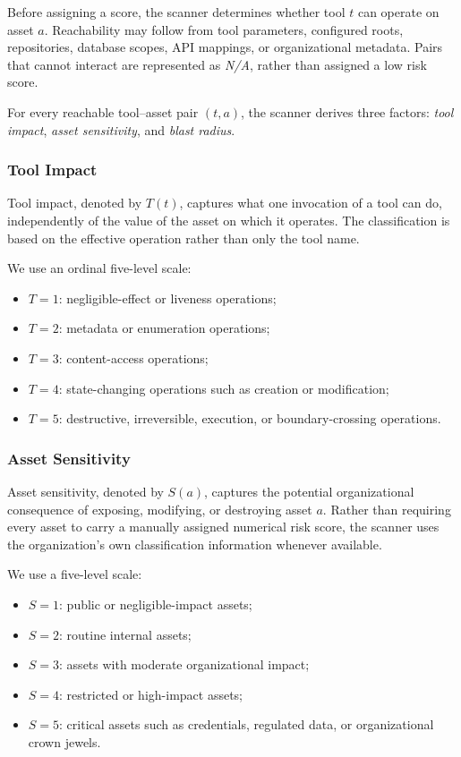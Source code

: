 \documentclass[sigconf]{acmart}
\begin{document}
Before assigning a score, the scanner determines whether tool $t$ can operate
on asset $a$. Reachability may follow from tool parameters, configured
roots, repositories, database scopes, API mappings, or organizational
metadata. Pairs that cannot interact are represented as \emph{N/A}, rather
than assigned a low risk score.

For every reachable tool--asset pair $(t,a)$, the scanner derives three factors:
\emph{tool impact}, \emph{asset sensitivity}, and \emph{blast radius}.


\subsubsection{Tool Impact}
\label{sec:impact}

Tool impact, denoted by $T(t)$, captures what one invocation of a tool can do,
independently of the value of the asset on which it operates. The
classification is based on the effective operation rather than only the tool
name.

We use an ordinal five-level scale:

\begin{itemize}
    \item $T=1$: negligible-effect or liveness operations;
    \item $T=2$: metadata or enumeration operations;
    \item $T=3$: content-access operations;
    \item $T=4$: state-changing operations such as creation or modification;
    \item $T=5$: destructive, irreversible, execution, or boundary-crossing
          operations.
\end{itemize}


\subsubsection{Asset Sensitivity}
\label{sec:sensitivity}

Asset sensitivity, denoted by $S(a)$, captures the potential organizational
consequence of exposing, modifying, or destroying asset $a$. Rather than
requiring every asset to carry a manually assigned numerical risk score,
the scanner uses the organization's own classification information whenever
available.

We use a five-level scale:

\begin{itemize}
    \item $S=1$: public or negligible-impact assets;
    \item $S=2$: routine internal assets;
    \item $S=3$: assets with moderate organizational impact;
    \item $S=4$: restricted or high-impact assets;
    \item $S=5$: critical assets such as credentials, regulated data, or
          organizational crown jewels.
\end{itemize}
\end{document}

